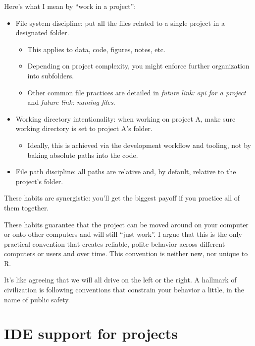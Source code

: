 \documentclass[
  letterpaper,
]{book}
\providecommand{\tightlist}{%
  \setlength{\itemsep}{0pt}\setlength{\parskip}{0pt}}\usepackage{longtable,booktabs,array}
\begin{document}
Here's what I mean by ``work in a project'':

\begin{itemize}
\tightlist
\item
  File system discipline: put all the files related to a single project
  in a designated folder.

  \begin{itemize}
  \tightlist
  \item
    This applies to data, code, figures, notes, etc.
  \item
    Depending on project complexity, you might enforce further
    organization into subfolders.
  \item
    Other common file practices are detailed in \emph{future link: api
    for a project} and \emph{future link: naming files}.
  \end{itemize}
\item
  Working directory intentionality: when working on project A, make sure
  working directory is set to project A's folder.

  \begin{itemize}
  \tightlist
  \item
    Ideally, this is achieved via the development workflow and tooling,
    not by baking absolute paths into the code.
  \end{itemize}
\item
  File path discipline: all paths are relative and, by default, relative
  to the project's folder.
\end{itemize}

These habits are synergistic: you'll get the biggest payoff if you
practice all of them together.

These habits guarantee that the project can be moved around on your
computer or onto other computers and will still ``just work''. I argue
that this is the only practical convention that creates reliable, polite
behavior across different computers or users and over time. This
convention is neither new, nor unique to R.

It's like agreeing that we will all drive on the left or the right. A
hallmark of civilization is following conventions that constrain your
behavior a little, in the name of public safety.

\hypertarget{ide-support-for-projects}{%
\section{IDE support for projects}\label{ide-support-for-projects}}
\end{document}
